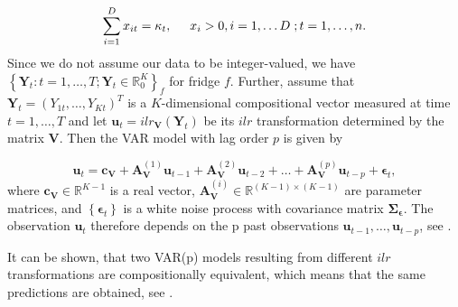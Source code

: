 \begin{equation}
\sum_{i=1}^D x_{it} = \kappa_t, \hspace{0.5cm} x_i > 0, i=1,\ldots D \hspace{0.1cm}; t=1,\ldots, n.
\label{eq:CTS characterisation}
\end{equation} 
%
Since we do not assume our data to be integer-valued, we have $\left\{\bm{Y}_t:t=1,\ldots,T; \bm{Y}_t \in \mathbb{R}_0^K \right\}_f$ for fridge $f$. Further, assume that $\bm{Y}_t=(Y_{1t},\ldots,Y_{Kt})^T$ is a $K$-dimensional compositional vector measured at time $t=1,\ldots,T$ and let $\textbf{u}_t = ilr_{\bm{V}}(\bm{Y}_t)$ be its $ilr$ transformation determined by the matrix $\textbf{V}$. Then the VAR model with lag order $p$ is given by

\begin{equation}
\textbf{u}_t = \textbf{c}_{\textbf{V}} + \textbf{A}_{\textbf{V}}^{(1)}\textbf{u}_{t-1} + \textbf{A}_{\textbf{V}}^{(2)}\textbf{u}_{t-2} + \ldots + \textbf{A}_{\textbf{V}}^{(p)}\textbf{u}_{t-p} + \bm{\epsilon}_{t},
\label{eq:VAR model}
\end{equation}
%
where $\textbf{c}_{\textbf{V}} \in \mathbb{R}^{K-1}$ is a real vector, $\textbf{A}_{\textbf{V}}^{(i)} \in \mathbb{R}^{(K-1) \times (K-1)}$ are parameter matrices, and $\left\{\bm{\epsilon}_t\right\}$ is a white noise process with covariance matrix $\bm{\Sigma_\epsilon}$. The observation $\textbf{u}_t$ therefore depends on the p past observations $\textbf{u}_{t-1},\ldots,\textbf{u}_{t-p}$, see \textcite{Kynclova:2015}. 

It can be shown, that two VAR(p) models resulting from different $ilr$ transformations are compositionally equivalent, which means that the same predictions are obtained, see \textcite{Kynclova:2015}. 



